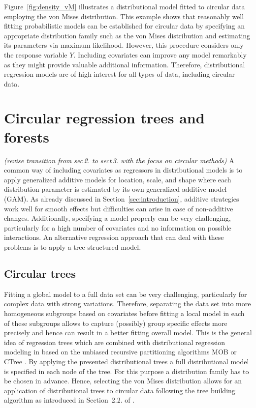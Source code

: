 \documentclass[nojss]{jss}
\newcommand{\fixme}[1]{\emph{\marginpar{FIXME} (#1)}}
\numberwithin{equation}{section}
\begin{document}
Figure~\ref{fig:density_vM} illustrates a distributional model fitted to circular data
employing the von Mises distribution.
This example shows that reasonably well fitting probabilistic models can
be established for circular data by specifying an appropriate distribution family 
such as the von Mises distribution and estimating its parameters via maximum likelihood. 
However, this procedure considers only the response variable $Y$. Including covariates 
can improve any model remarkably as they might provide valuable additional information.
Therefore, distributional regression models are of high interest for all types of data,
including circular data.


\section{Circular regression trees and forests}
\label{sec:tree_forest}
\fixme{revise transition from sec\,2. to sect\,3. with the focus on circular methods}
A common way of including covariates as regressors in distributional models is to apply
generalized additive models for location, scale, and shape 
\citep[GAMLSS, ][]{Rigby+Stasinopoulos:2005} where each distribution parameter is estimated
by its own generalized additive model (GAM).
As already discussed in Section~\ref{sec:introduction}, additive strategies work well 
for smooth effects but difficulties can arise in case of non-additive changes. Additionally, 
specifying a model properly can be very challenging, particularly for a high number of covariates 
and no information on possible interactions.
An alternative regression approach that can deal with these problems is to apply a tree-structured 
model.

\subsection{Circular trees}
\label{sec:circtree}
Fitting a global model to a full data set can be very challenging, particularly for 
complex data with strong variations. Therefore, separating the data set into more homogeneous 
subgroups based on covariates before fitting a local model in each of these subgroups allows 
to capture (possibly) group specific effects more precisely and hence can result in a better 
fitting overall model.
This is the general idea of regression trees which are combined with distributional regression
modeling in \cite{Schlosser+Hothorn+Stauffer:2019} based on the unbiased recursive partitioning 
algorithms MOB \citep{Zeileis+Hothorn+Hornik:2008} or CTree \citep{Hothorn+Hornik+Zeileis:2006}.
By applying the presented distributional trees a full distributional model is specified in each 
node of the tree. For this purpose a distribution family has to be chosen in advance. Hence, 
selecting the von Mises distribution allows for an application of distributional trees to circular
data following the tree building algorithm as introduced in Section~2.2. of 
\cite{Schlosser+Hothorn+Stauffer:2019}. 
\end{document}
